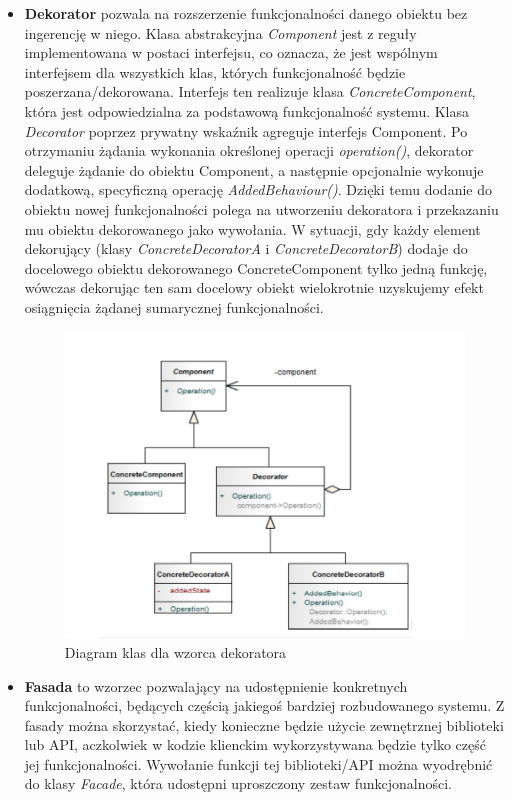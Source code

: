 \documentclass[a4paper,12pt,oneside]{book}
\begin{document}
\begin{itemize}
                    \item \textbf{Dekorator} pozwala na rozszerzenie funkcjonalności danego obiektu bez ingerencję w niego. Klasa abstrakcyjna \textit{Component} jest z reguły implementowana w postaci interfejsu, co oznacza, że jest wspólnym interfejsem dla wszystkich klas, których funkcjonalność będzie poszerzana/dekorowana. Interfejs ten realizuje klasa \textit{ConcreteComponent}, która jest odpowiedzialna za podstawową funkcjonalność systemu. Klasa \textit{Decorator} poprzez prywatny wskaźnik agreguje interfejs Component. Po otrzymaniu żądania wykonania określonej operacji \textit{operation()}, dekorator deleguje żądanie do obiektu Component, a następnie opcjonalnie wykonuje dodatkową, specyficzną operację \textit{AddedBehaviour()}. Dzięki temu dodanie do obiektu nowej funkcjonalności polega na utworzeniu dekoratora i przekazaniu mu obiektu dekorowanego jako wywołania. W sytuacji, gdy każdy element dekorujący (klasy \textit{ConcreteDecoratorA} i \textit{ConcreteDecoratorB}) dodaje do docelowego obiektu dekorowanego ConcreteComponent tylko jedną funkcję, wówczas dekorując ten sam docelowy obiekt wielokrotnie uzyskujemy efekt osiągnięcia żądanej sumarycznej funkcjonalności.
                    \begin{figure}[h]
                        \centering
                        \includegraphics[width=\textwidth/2]{images/decorator.jpg}
                        \caption{Diagram klas dla wzorca dekoratora}
                        \label{fig:twojastara21}
                    \end{figure}
                    \item \textbf{Fasada} to wzorzec pozwalający na udostępnienie konkretnych funkcjonalności, będących częścią jakiegoś bardziej rozbudowanego systemu. Z fasady można skorzystać, kiedy konieczne będzie użycie zewnętrznej biblioteki lub API, aczkolwiek w kodzie klienckim wykorzystywana będzie tylko część jej funkcjonalności. Wywołanie funkcji tej biblioteki/API można wyodrębnić do klasy \textit{Facade}, która udostępni uproszczony zestaw funkcjonalności.

\end{itemize}
\end{document}
